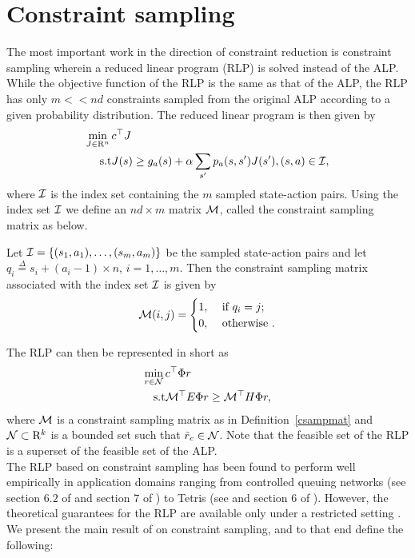 \section{Constraint sampling}
The most important work in the direction of constraint reduction is constraint sampling \cite{CS} wherein a reduced linear program (RLP) is solved instead of the ALP. While the objective function of the RLP is the same as that of the ALP, the RLP has only $m<<nd$ constraints sampled from the original ALP according to a given probability distribution. The reduced linear program is then given by
\begin{align}\label{rlp}
\begin{split}
\min_{J\in \R^n}\, &c^\top J\\
\text{s.t}\mb &J(s)\geq g_a(s)+\alpha\sum_{s'}p_a(s,s')J(s'), \mb (s,a) \in \I,
\end{split}
\end{align}
where $\mathcal{I}$ is the index set containing the $m$ sampled state-action pairs. Using the index set $\mathcal{I}$ we define an $nd\times m$ matrix $\mathcal{M}$, called the constraint sampling matrix as below.
\begin{definition}\label{csampmat}
Let $\mathcal{I}=\{(s_1,a_1),\ldots,(s_m,a_m)\}$ be the sampled state-action pairs and let $q_i\stackrel{\Delta}{=}s_i+(a_i-1)\times n$, $i=1,\ldots,m$. Then the constraint sampling matrix associated with the index set $\mathcal{I}$ is given by
\begin{align}
\mathcal{M}(i,j)
=
\begin{cases}
1, & \text{ if } q_i = j;\\
0, & \text{ otherwise }.
\end{cases}
\end{align}
\end{definition}
The RLP can then be represented in short as
\begin{align}\label{rlpshort}
\begin{split}
\min_{r\in \N}\, &c^\top \Phi r\\
\text{s.t}\mb & \M^\top E \Phi r \geq \M^\top H \Phi r,
\end{split}
\end{align}
where $\mathcal{M}$ is a constraint sampling matrix as in Definition~\ref{csampmat} and $\mathcal{N}\subset \mathrm{R}^k$ is a bounded set such that $\tilde{r}_c \in \mathcal{N}$. Note that the feasible set of the RLP is a superset of the feasible set of the ALP.\\
The RLP based on constraint sampling has been found to perform well empirically in application domains ranging from controlled queuing networks (see section $6.2$ of \cite{ALP} and section $7$ of \cite{SALP}) to Tetris (see \cite{CST} and section $6$ of \cite{SALP}). However, the theoretical guarantees for the RLP are available only under a restricted setting \cite{CS}. We present the main result of \cite{CS} on constraint sampling, and to that end define the following:
